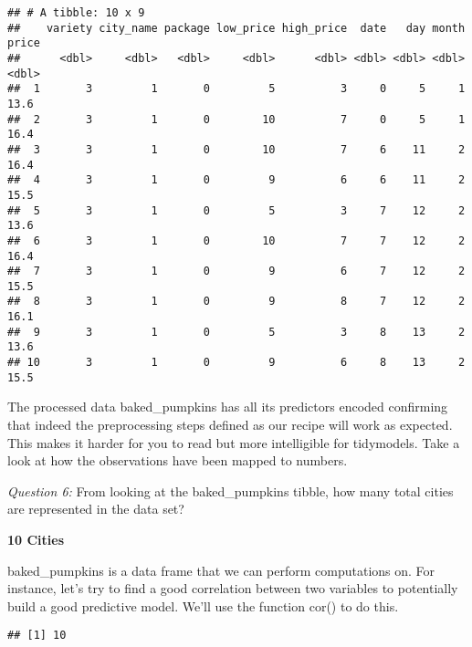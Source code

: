 \documentclass[
]{article}
\newenvironment{Shaded}{\begin{snugshade}}{\end{snugshade}}
\newcommand{\CommentTok}[1]{\textcolor[rgb]{0.56,0.35,0.01}{\textit{#1}}}
\newcommand{\FunctionTok}[1]{\textcolor[rgb]{0.00,0.00,0.00}{#1}}
\newcommand{\NormalTok}[1]{#1}
\newcommand{\SpecialCharTok}[1]{\textcolor[rgb]{0.00,0.00,0.00}{#1}}
\begin{document}
\begin{verbatim}
## # A tibble: 10 x 9
##    variety city_name package low_price high_price  date   day month price
##      <dbl>     <dbl>   <dbl>     <dbl>      <dbl> <dbl> <dbl> <dbl> <dbl>
##  1       3         1       0         5          3     0     5     1  13.6
##  2       3         1       0        10          7     0     5     1  16.4
##  3       3         1       0        10          7     6    11     2  16.4
##  4       3         1       0         9          6     6    11     2  15.5
##  5       3         1       0         5          3     7    12     2  13.6
##  6       3         1       0        10          7     7    12     2  16.4
##  7       3         1       0         9          6     7    12     2  15.5
##  8       3         1       0         9          8     7    12     2  16.1
##  9       3         1       0         5          3     8    13     2  13.6
## 10       3         1       0         9          6     8    13     2  15.5
\end{verbatim}

The processed data baked\_pumpkins has all its predictors encoded
confirming that indeed the preprocessing steps defined as our recipe
will work as expected. This makes it harder for you to read but more
intelligible for tidymodels. Take a look at how the observations have
been mapped to numbers.

\emph{Question 6:} From looking at the baked\_pumpkins tibble, how many
total cities are represented in the data set?

\textbf{10 Cities}

baked\_pumpkins is a data frame that we can perform computations on. For
instance, let's try to find a good correlation between two variables to
potentially build a good predictive model. We'll use the function cor()
to do this.

\begin{Shaded}
\end{Shaded}

\begin{verbatim}
## [1] 10
\end{verbatim}

\begin{Shaded}
\end{Shaded}
\end{document}
